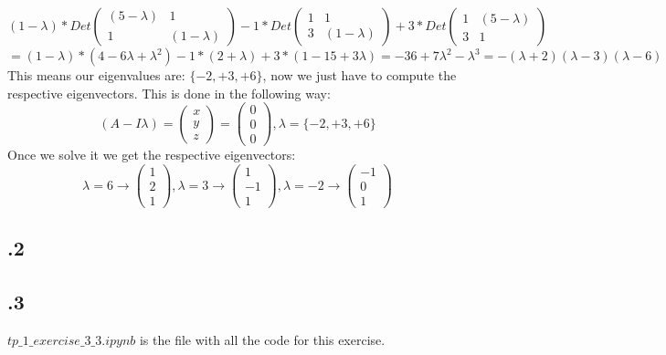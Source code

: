 \documentclass[a4paper]{article}
\begin{document}
$(1 - \lambda) * Det \left( \begin{matrix} (5 - \lambda) & 1 \\ 1 & (1 - \lambda) \end{matrix} \right) - 1 * Det \left( \begin{matrix} 1 & 1 \\ 3 & (1 - \lambda) \end{matrix} \right) + 3 * Det \left( \begin{matrix} 1 & (5 - \lambda) \\ 3 & 1 \end{matrix} \right) $\\$= (1 - \lambda) * (4 - 6\lambda + \lambda^{2}) - 1 * (2 + \lambda) + 3 * (1 - 15 + 3\lambda) = -36 + 7\lambda^{2} - \lambda^{3} = -(\lambda + 2)(\lambda - 3)(\lambda - 6)$\\
This means our eigenvalues are: $\{-2, +3, +6\}$, now we just have to compute the respective eigenvectors. This is done in the following way:
$$(A - I\lambda) = \left(\begin{matrix} x \\ y \\ z \end{matrix}\right) = \left(\begin{matrix} 0 \\ 0 \\ 0 \end{matrix}\right), \lambda = \{-2, +3, +6\} $$
Once we solve it we get the respective eigenvectors:
$$\lambda = 6 \longrightarrow \left(\begin{matrix} 1 \\ 2 \\ 1 \end{matrix}\right), \lambda = 3 \longrightarrow \left(\begin{matrix} 1 \\ -1 \\ 1 \end{matrix}\right), \lambda = -2 \longrightarrow \left(\begin{matrix} -1 \\ 0 \\ 1 \end{matrix}\right)$$

\subsection*{.2}
\subsection*{.3}
\textbf{$tp\_1\_exercise\_3\_3.ipynb$} is the file with all the code for this exercise.
\end{document}
